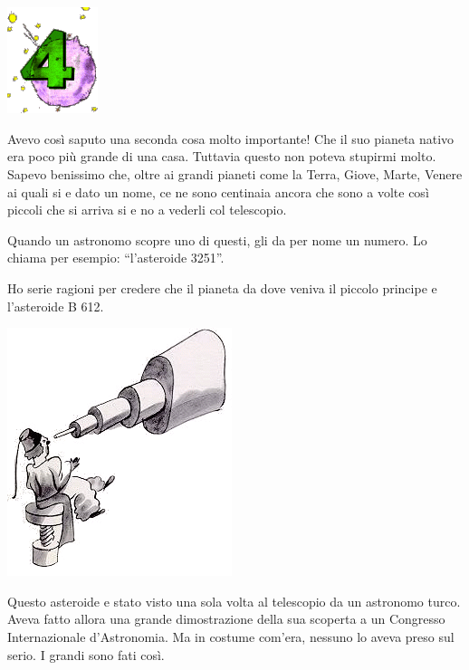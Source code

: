 \documentclass[11pt]{scrbook}
\begin{document}
\chapter{}
\begin{center}
\includegraphics{./img/chapter4.png}
\end{center}

Avevo così saputo una seconda cosa molto importante! Che il suo pianeta
nativo era poco più grande di una casa. Tuttavia questo non poteva
stupirmi molto. Sapevo benissimo che, oltre ai grandi pianeti come la
Terra, Giove, Marte, Venere ai quali si e dato un nome, ce ne sono
centinaia ancora che sono a volte così piccoli che si arriva si e no a
vederli col telescopio.

Quando un astronomo scopre uno di questi, gli da per nome un numero. Lo
chiama per esempio: ``l'asteroide 3251''.

Ho serie ragioni per credere che il pianeta da dove veniva il piccolo
principe e l'asteroide B 612.

\begin{center}
\includegraphics{./img/4b.png}

\end{center}

Questo asteroide e stato visto una sola volta al telescopio da un
astronomo turco. Aveva fatto allora una grande dimostrazione della sua
scoperta a un Congresso Internazionale d'Astronomia. Ma in costume
com'era, nessuno lo aveva preso sul serio. I grandi sono fati così.
\end{document}
